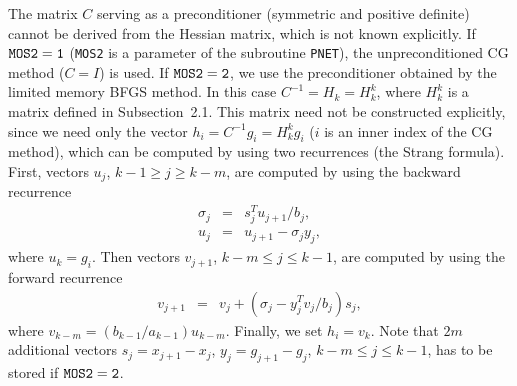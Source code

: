 \documentclass{esub2acm}
\begin{document}
The matrix $C$ serving as a preconditioner (symmetric and positive definite)
cannot be derived from the Hessian matrix, which is not known explicitly.
If ${\tt MOS2=1}$ ({\tt MOS2} is a parameter of the subroutine {\tt PNET}),
the unpreconditioned CG method ($C = I$) is used. If ${\tt MOS2=2}$,
we use the preconditioner obtained by the limited memory BFGS method.
In this case $C^{-1} = H_k = H_k^k$, where $H_k^k$ is a matrix defined
in Subsection~2.1. This matrix need not be constructed explicitly,
since we need only the vector $h_i = C^{-1} g_i = H_k^k g_i$
($i$ is an inner index of the CG method), which can be computed
by using two recurrences (the Strang formula). First, vectors
$u_j$, $k-1 \geq j \geq k-m$, are computed by using the backward
recurrence
%
\begin{eqnarray*}
\sigma_j & = & s_j^Tu_{j+1} / b_j, \\
u_j & = & u_{j+1} - \sigma_j y_j,
\end{eqnarray*}
%
where $u_k = g_i$. Then vectors
$v_{j+1}$, $k-m \leq j \leq k-1$, are computed by using the forward
recurrence
%
\begin{eqnarray*}
v_{j+1} & = & v_j + (\sigma_j - y_j^T v_j/b_j) s_j,
\end{eqnarray*}
%
where $v_{k-m} = (b_{k-1}/a_{k-1}) u_{k-m}$.
Finally, we set $h_i = v_k$. Note that $2m$ additional vectors
$s_j = x_{j+1} - x_j$, $y_j = g_{j+1}- g_j$, $k-m \le j \le k-1$,
has to be stored if ${\tt MOS2=2}$.

\vspace{5mm}


\vspace{3mm}
\end{document}
